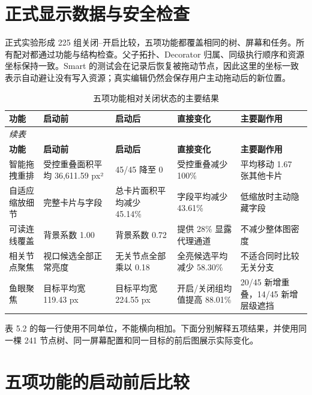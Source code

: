 \documentclass[11pt,a4paper,oneside,extrafontsizes]{memoir}
\begin{document}
\section{正式显示数据与安全检查}

正式实验形成 225 组关闭–开启比较，五项功能都覆盖相同的树、屏幕和任务。所有配对都通过功能与结构检查。父子拓扑、Decorator 归属、同级执行顺序和资源坐标保持一致。Smart 的测试会在记录后恢复被拖动节点，因此这里的坐标一致表示自动避让没有写入资源；真实编辑仍然会保存用户主动拖动后的新位置。

\begin{center}
\small
\begin{longtable}{@{}p{} p{} p{} p{} p{}@{}}
\caption{五项功能相对关闭状态的主要结果}\label{tab:auto-7}\\
\toprule
\textbf{功能} & \textbf{启动前} & \textbf{启动后} & \textbf{直接变化} & \textbf{主要副作用} \\
\midrule
\endfirsthead
\multicolumn{5}{l}{\small\itshape 续表}\\
\toprule
\textbf{功能} & \textbf{启动前} & \textbf{启动后} & \textbf{直接变化} & \textbf{主要副作用} \\
\midrule
\endhead
智能拖拽重排 & 受控重叠面积平均 36,611.59 px² & 45/45 降至 0 & 受控重叠减少 100\% & 平均移动 1.67 张其他卡片 \\
自适应缩放细节 & 完整卡片与字段 & 总卡片面积平均减少 45.14\% & 字段平均减少 43.61\% & 低缩放时主动隐藏字段 \\
可读连线覆盖 & 背景系数 1.00 & 背景系数 0.72 & 提供 28\% 显露代理通道 & 不减少整体图密度 \\
相关节点聚焦 & 视口候选全部正常亮度 & 无关节点全部乘以 0.18 & 全亮候选平均减少 58.30\% & 不适合同时比较无关分支 \\
鱼眼聚焦 & 目标平均宽 119.43 px & 目标平均宽 224.55 px & 开启/关闭组均值提高 88.01\% & 20/45 新增重叠，14/45 新增层级遮挡 \\
\bottomrule
\end{longtable}
\end{center}

表 5.2 的每一行使用不同单位，不能横向相加。下面分别解释五项结果，并使用同一棵 241 节点树、同一屏幕配置和同一目标的前后图展示实际变化。

\section{五项功能的启动前后比较}
\end{document}
